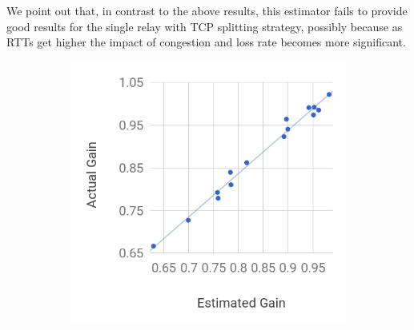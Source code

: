 \documentclass{hotnets17}
\newcommand{\mycomm}[3]{{\color{#2} \textbf{[#1: #3]}}}
\newcommand{\mycomm}[3]{}
\newcommand{\IK}[1]{\mycomm{IK}{blue}{#1}}
\newcommand{\AB}[1]{\mycomm{AB}{Orange}{#1}}
\begin{document}
We point out that, in contrast to the above results, this estimator fails to provide good results for the single relay with TCP splitting strategy, possibly because as RTTs get higher the impact of congestion and loss rate becomes more significant.


\begin{figure}[t]
  \centering
  
    \begin{subfigure}{0.47\columnwidth}
  \centering
  \includegraphics[width=\columnwidth]{figures/gainEstimateVsActual-nat-1hop-newer}
    \caption{}
    \label{fig:rtt-estimate-nat-1hop}
\end{subfigure} \hfill
\begin{subfigure}{0.47\columnwidth}
  \centering

\end{subfigure}
\end{figure}
\end{document}
